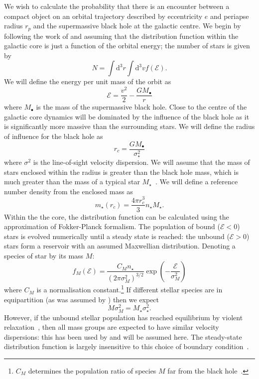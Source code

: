 \documentclass[useAMS,usedcolumn,usegraphicx,usenatbib]{mn2e}
\newcommand{\dd}{\ensuremath{\mathrm{d}}}
\begin{document}
We wish to calculate the probability that there is an encounter between a compact object on an orbital trajectory described by eccentricity $e$ and periapse radius $r_p$ and the supermassive black hole at the galactic centre. We begin by following the work of \citet{Bahcall1976, Bahcall1977} and assuming that the distribution function within the galactic core is just a function of the orbital energy; the number of stars is given by
\begin{equation}
N = \int \dd^3r \int \dd^3v f(\mathcal{E}).
\end{equation}
We will define the energy per unit mass of the orbit as
\begin{equation}
\mathcal{E} = \frac{v^2}{2} - \frac{GM_\bullet}{r}
\end{equation}
where $M_\bullet$ is the mass of the supermassive black hole. Close to the centre of the galactic core dynamics will be dominated by the influence of the black hole as it is significantly more massive than the surrounding stars. We will define the radius of influence for the black hole as
\begin{equation}
r_c = \frac{GM_\bullet}{\sigma_\star^2}
\end{equation}
where $\sigma^2$ is the line-of-sight velocity dispersion. We will assume that the mass of stars enclosed within the radius is greater than the black hole mass, which is much greater than the mass of a typical star $M_\star$~\citep{Bahcall1976}. We will define a reference number density from the enclosed mass as
\begin{equation}
m_\star(r_c) = \frac{4\pi r_c^3}{3}n_\star M_\star.
\end{equation}
Within the the core, the distribution function can be calculated using the approximation of Fokker-Planck formalism. The population of bound ($\mathcal{E} < 0$) stars is evolved numerically until a steady state is reached: the unbound ($\mathcal{E} > 0$) stars form a reservoir with an assumed Maxwellian distribution. Denoting a species of star by its mass $M$:
\begin{equation}
f_M(\mathcal{E}) = \frac{C_M n_\star}{(2\pi\sigma_M^2)^{3/2}} \exp\left(-\frac{\mathcal{E}}{\sigma_M^2}\right)
\label{eq:Unbound_DF}
\end{equation}
where $C_M$ is a normalisation constant.\footnote{$C_M$ determines the population ratio of species $M$ far from the black hole~\cite{Alexander2009}.} If different stellar species are in equipartition (as was assumed by \citet{Bahcall1976, Bahcall1977}) then we expect
\begin{equation}
M \sigma_M^2 = M_\star \sigma_\star^2.
\end{equation}
However, if the unbound stellar population has reached equilibrium by violent relaxation~\citep{Lynden-Bell1967}, then all mass groups are expected to have similar velocity dispersions: this has been used by \citet{Alexander2009, O'Leary2009} and will be assumed here. The steady-state distribution function is largely insensitive to this choice of boundary condition~\citep{Bahcall1977, Alexander2009}.
\end{document}
